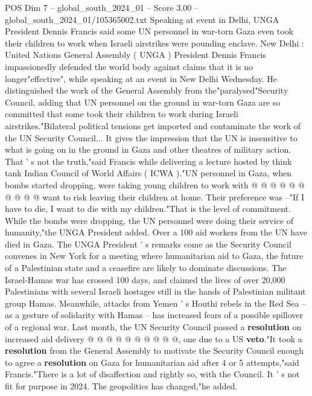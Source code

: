 \begin{textsample}{POS Dim 7 – global\_south\_2024\_01 – Score 3.00 – global\_south\_2024\_01/105365002.txt}  \label{ex:f7_pos_043}
Speaking at event in Delhi, UNGA President Dennis Francis said some UN personnel in war-torn Gaza even took their children to work when Israeli airstrikes were pounding enclave.
New Delhi : United Nations General Assembly ( UNGA ) President Dennis Francis impassionedly defended the world body against claims that it is no longer"effective", while speaking at an event in New Delhi Wednesday.
He distinguished the work of the General Assembly from the"paralysed"Security Council, adding that UN personnel on the ground in war-torn Gaza are so committed that some took their children to work during Israeli airstrikes."Bilateral political tensions get imported and contaminate the work of the UN Security Council...
It gives the impression that the UN is insensitive to what is going on in the ground in Gaza and other theatres of military action.
That ' s not the truth,"said Francis while delivering a lecture hosted by think tank Indian Council of World Affairs ( ICWA )."UN personnel in Gaza, when bombs started dropping, were taking young children to work with @ @ @ @ @ @ @ @ @ @ want to risk leaving their children at home.
Their preference was --"If I have to die, I want to die with my children."That is the level of commitment.
While the bombs were dropping, the UN personnel were doing their service of humanity,"the UNGA President added.
Over a 100 aid workers from the UN have died in Gaza.
The UNGA President ' s remarks come as the Security Council convenes in New York for a meeting where humanitarian aid to Gaza, the future of a Palestinian state and a ceasefire are likely to dominate discussions.
The Israel-Hamas war has crossed 100 days, and claimed the lives of over 20,000 Palestinians with several Israeli hostages still in the hands of Palestinian militant group Hamas.
Meanwhile, attacks from Yemen ' s Houthi rebels in the Red Sea -- as a gesture of solidarity with Hamas -- has increased fears of a possible spillover of a regional war.
Last month, the UN Security Council passed a \textbf{resolution} on increased aid delivery @ @ @ @ @ @ @ @ @ @, one due to a US \textbf{veto}."It took a \textbf{resolution} from the General Assembly to motivate the Security Council enough to agree a \textbf{resolution} on Gaza for humanitarian aid after 4 or 5 attempts,"said Francis."There is a lot of disaffection and rightly so, with the Council.
It ' s not fit for purpose in 2024.
The geopolitics has changed,"he added.

\end{textsample}
